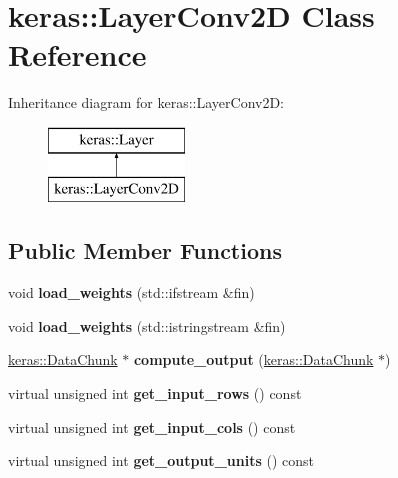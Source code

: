 \hypertarget{classkeras_1_1_layer_conv2_d}{}\section{keras\+:\+:Layer\+Conv2D Class Reference}
\label{classkeras_1_1_layer_conv2_d}
Inheritance diagram for keras\+:\+:Layer\+Conv2D\+:\begin{figure}[H]
\begin{center}
\leavevmode
\includegraphics[height=2.000000cm]{classkeras_1_1_layer_conv2_d}
\end{center}
\end{figure}
\subsection*{Public Member Functions}
\begin{DoxyCompactItemize}
\item 
\mbox{\label{classkeras_1_1_layer_conv2_d_a210d4bb2d1d1667877acab59c138cb68}} 
void {\bfseries load\+\_\+weights} (std\+::ifstream \&fin)
\item 
\mbox{\label{classkeras_1_1_layer_conv2_d_a8a2811545a58db3d6248fa3e87344c0b}} 
void {\bfseries load\+\_\+weights} (std\+::istringstream \&fin)
\item 
\mbox{\label{classkeras_1_1_layer_conv2_d_a0615a71c32cf732d4ee6965521c1110a}} 
\mbox{\hyperlink{classkeras_1_1_data_chunk}{keras\+::\+Data\+Chunk}} $\ast$ {\bfseries compute\+\_\+output} (\mbox{\hyperlink{classkeras_1_1_data_chunk}{keras\+::\+Data\+Chunk}} $\ast$)
\item 
\mbox{\label{classkeras_1_1_layer_conv2_d_a2b89ead8620caffc360cbf1a74a31fea}} 
virtual unsigned int {\bfseries get\+\_\+input\+\_\+rows} () const
\item 
\mbox{\label{classkeras_1_1_layer_conv2_d_ab0bc4c2a6be1dfb536a5118b9aace4a0}} 
virtual unsigned int {\bfseries get\+\_\+input\+\_\+cols} () const
\item 
\mbox{\label{classkeras_1_1_layer_conv2_d_a6e57208854c7130737a04b0eb9c5638c}} 
virtual unsigned int {\bfseries get\+\_\+output\+\_\+units} () const
\end{DoxyCompactItemize}
